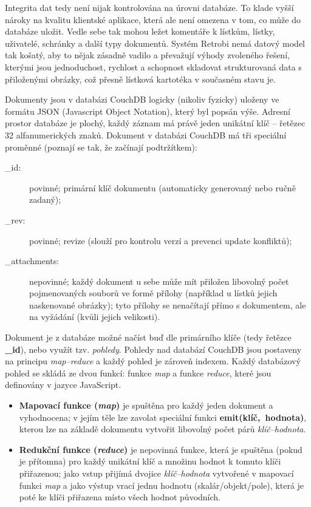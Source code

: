 Integrita dat tedy není nijak kontrolována na úrovni databáze. To klade vyšší nároky na kvalitu klientské aplikace, která ale není omezena v tom, co může do databáze uložit. Vedle sebe tak mohou ležet komentáře k lístkům, lístky, uživatelé, schránky a další typy dokumentů. Systém Retrobi nemá datový model tak košatý, aby to nějak zásadně vadilo a převažují výhody zvoleného řešení, kterými jsou jednoduchost, rychlost a schopnost skladovat strukturovaná data s přiloženými obrázky, což přesně lístková kartotéka v současném stavu je.

Dokumenty jsou v databázi CouchDB logicky (nikoliv fyzicky) uloženy ve formátu JSON (Javascript Object Notation), který byl popsán výše. Adresní prostor databáze je plochý, každý záznam má právě jeden unikátní klíč -- řetězec 32 alfanumerických znaků. Dokument v databázi CouchDB má tři speciální proměnné (poznají se tak, že začínají podtržítkem):

\begin{description}
\item[\_id:]{povinné; primární klíč dokumentu (automaticky generovaný nebo ručně zadaný);}
\item[\_rev:]{povinné; revize (slouží pro kontrolu verzí a prevenci update konfliktů);}
\item[\_attachments:]{nepovinné; každý dokument u sebe může mít přiložen libovolný počet pojmenovaných souborů ve formě přílohy (například u lístků jejich naskenované obrázky); tyto přílohy se nenačítají přímo s dokumentem, ale na vyžádání (kvůli jejich velikosti).}
\end{description}

Dokument je z databáze možné načíst buď dle primárního klíče (tedy řetězce {\bf \_id}), nebo využít tzv. {\em pohledy}. Pohledy nad databází CouchDB jsou postaveny na principu {\em map--reduce} a každý pohled je zároveň indexem. Každý databázový pohled se skládá ze dvou funkcí: funkce {\em map} a funkce {\em reduce}, které jsou definovány v jazyce JavaScript.

\begin{itemize}
\item{{\bf Mapovací funkce ({\em map})} je spuštěna pro každý jeden dokument a vyhodnocena; v jejím těle lze zavolat speciální funkci {\bf emit(klíč,~hodnota)}, kterou lze na základě dokumentu vytvořit libovolný počet párů {\em klíč--hodnota}.}
\item{{\bf Redukční funkce ({\em reduce})} je nepovinná funkce, která je spuštěna (pokud je přítomna) pro každý unikátní klíč a množinu hodnot k tomuto klíči přiřazenou; jako vstup přijímá dvojice {\em klíč--hodnota} vytvořené v mapovací funkci {\em map} a jako výstup vrací jednu hodnotu (skalár/objekt/pole), která je poté ke klíči přiřazena místo všech hodnot původních.}
\end{itemize}

